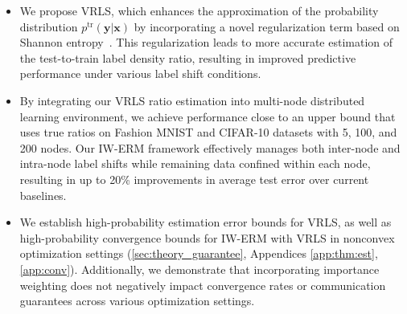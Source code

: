 \begin{itemize}[leftmargin=0pt]
\item We propose VRLS, which enhances the approximation of the probability distribution \( p^{\text{tr}}(\boldsymbol{y} | \boldsymbol{x}) \) by incorporating a novel regularization term based on Shannon entropy~\citep{neo2024maxent}. This regularization leads to more accurate estimation of the test-to-train label density ratio, resulting in improved predictive performance under various label shift conditions.

\item By integrating our VRLS ratio estimation into multi-node distributed learning environment, we achieve performance close to an upper bound that uses true ratios on Fashion MNIST and CIFAR-10 datasets with 5, 100, and 200 nodes. Our IW-ERM framework effectively manages both inter-node and intra-node label shifts while remaining data confined within each node, resulting in up to 20\% improvements in average test error over current baselines.
\item We establish high-probability estimation error bounds for VRLS, as well as high-probability convergence bounds for IW-ERM with VRLS in nonconvex optimization settings (\cref{sec:theory_guarantee}, Appendices \ref{app:thm:est}, \ref{app:conv}). Additionally, we demonstrate that incorporating importance weighting does not negatively impact convergence rates or communication guarantees across various optimization settings.
\end{itemize}
